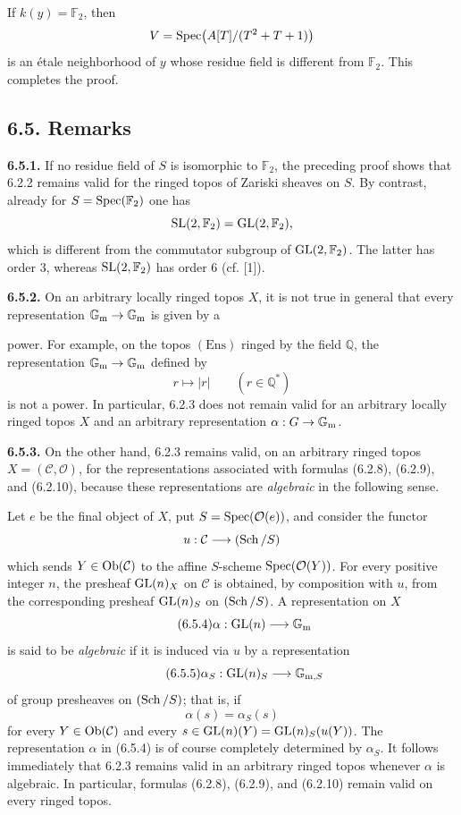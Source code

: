 If $k(y)=\mathbb F_2$, then
\[
V=\operatorname{Spec}\bigl(A[T]/(T^2+T+1)\bigr)
\]
is an \'etale neighborhood of $y$ whose residue field is different from
$\mathbb F_2$. This completes the proof.

\subsection*{6.5. Remarks}
\textbf{6.5.1.}
If no residue field of $S$ is isomorphic to $\mathbb F_2$, the preceding
proof shows that 6.2.2 remains valid for the ringed topos of Zariski sheaves
on $S$. By contrast, already for $S=\operatorname{Spec}(\mathbb F_2)$ one has
\[
\operatorname{SL}(2,\mathbb F_2)=\operatorname{GL}(2,\mathbb F_2),
\]
which is different from the commutator subgroup of
$\operatorname{GL}(2,\mathbb F_2)$. The latter has order $3$, whereas
$\operatorname{SL}(2,\mathbb F_2)$ has order $6$ (cf. [1]).

\textbf{6.5.2.}
On an arbitrary locally ringed topos $X$, it is not true in general that
every representation $\mathbb G_{\mathrm m}\to\mathbb G_{\mathrm m}$ is given by a

power. For example, on the topos $(\mathrm{Ens})$ ringed by the field
$\mathbb Q$, the representation $\mathbb G_{\mathrm m}\to\mathbb G_{\mathrm m}$ defined by
\[
r\longmapsto |r|\qquad(r\in\mathbb Q^*)
\]
is not a power. In particular, 6.2.3 does not remain valid for an arbitrary
locally ringed topos $X$ and an arbitrary representation
$\alpha:G\to\mathbb G_{\mathrm m}$.

\textbf{6.5.3.}
On the other hand, 6.2.3 remains valid, on an arbitrary ringed topos
$X=(\mathcal C,\mathcal O)$, for the representations associated with
formulas (6.2.8), (6.2.9), and (6.2.10), because these representations are
\emph{algebraic} in the following sense.

Let $e$ be the final object of $X$, put
$S=\operatorname{Spec}(\mathcal O(e))$, and consider the functor
\[
u:\mathcal C\longrightarrow(\operatorname{Sch}/S)
\]
which sends $Y\in\operatorname{Ob}(\mathcal C)$ to the affine $S$-scheme
$\operatorname{Spec}(\mathcal O(Y))$. For every positive integer $n$, the presheaf
$\operatorname{GL}(n)_X$ on $\mathcal C$ is obtained, by composition with $u$, from the
corresponding presheaf $\operatorname{GL}(n)_S$ on $(\operatorname{Sch}/S)$. A representation on $X$
\begin{equation}\tag{6.5.4}
\alpha:\operatorname{GL}(n)\longrightarrow\mathbb G_{\mathrm m}
\end{equation}
is said to be \emph{algebraic} if it is induced via $u$ by a representation
\begin{equation}\tag{6.5.5}
\alpha_S:\operatorname{GL}(n)_S\longrightarrow\mathbb G_{\mathrm m,S}
\end{equation}
of group presheaves on $(\operatorname{Sch}/S)$; that is, if
\[
\alpha(s)=\alpha_S(s)
\]
for every $Y\in\operatorname{Ob}(\mathcal C)$ and every
$s\in\operatorname{GL}(n)(Y)=\operatorname{GL}(n)_S(u(Y))$. The representation $\alpha$ in (6.5.4) is
of course completely determined by $\alpha_S$. It follows immediately that
6.2.3 remains valid in an arbitrary ringed topos whenever $\alpha$ is
algebraic. In particular, formulas (6.2.8), (6.2.9), and (6.2.10) remain
valid on every ringed topos.

